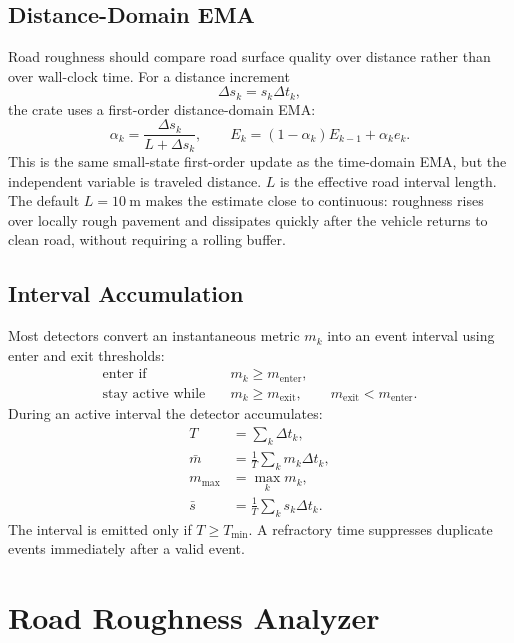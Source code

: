 \documentclass[11pt]{article}
\newcommand{\dt}{\Delta t}
\begin{document}
\subsection{Distance-Domain EMA}

Road roughness should compare road surface quality over distance rather than
over wall-clock time. For a distance increment
\begin{equation}
  \Delta s_k = s_k\Delta t_k,
\end{equation}
the crate uses a first-order distance-domain EMA:
\begin{equation}
  \alpha_k = \frac{\Delta s_k}{L+\Delta s_k},
  \qquad
  E_k = (1-\alpha_k)E_{k-1}+\alpha_k e_k .
\end{equation}
This is the same small-state first-order update as the time-domain EMA, but the
independent variable is traveled distance. \(L\) is the effective road interval
length. The default \(L=10~\mathrm{m}\) makes the estimate close to continuous:
roughness rises over locally rough pavement and dissipates quickly after the
vehicle returns to clean road, without requiring a rolling buffer.

\subsection{Interval Accumulation}

Most detectors convert an instantaneous metric \(m_k\) into an event interval
using enter and exit thresholds:
\begin{align}
  \text{enter if}\quad &m_k \ge m_{\mathrm{enter}},\\
  \text{stay active while}\quad &m_k \ge m_{\mathrm{exit}},
  \qquad m_{\mathrm{exit}} < m_{\mathrm{enter}}.
\end{align}
During an active interval the detector accumulates:
\begin{align}
  T &= \sum_k \dt_k,\\
  \bar{m} &= \frac{1}{T}\sum_k m_k\dt_k,\\
  m_{\max} &= \max_k m_k,\\
  \bar{s} &= \frac{1}{T}\sum_k s_k\dt_k.
\end{align}
The interval is emitted only if \(T\ge T_{\min}\). A refractory time suppresses
duplicate events immediately after a valid event.

\section{Road Roughness Analyzer}
\end{document}
